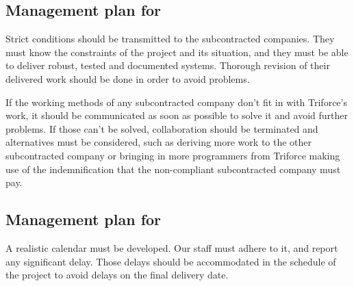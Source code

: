 \subsection{Management plan for }

Strict conditions should be transmitted to the subcontracted companies. They must know the constraints of the project and its situation, and they must be able to deliver robust, tested and documented systems. Thorough revision of their delivered work should be done in order to avoid problems.

If the working methods of any subcontracted company don't fit in with Triforce's work, it should be communicated as soon as possible to solve it and avoid further problems. If those can't be solved, collaboration should be terminated and alternatives must be considered, such as deriving more work to the other subcontracted company or bringing in more programmers from Triforce making use of the indemnification that the non-compliant subcontracted company must pay.

\subsection{Management plan for }

A realistic calendar must be developed. Our staff must adhere to it, and report any significant delay. Those delays should be accommodated in the schedule of the project to avoid delays on the final delivery date.
